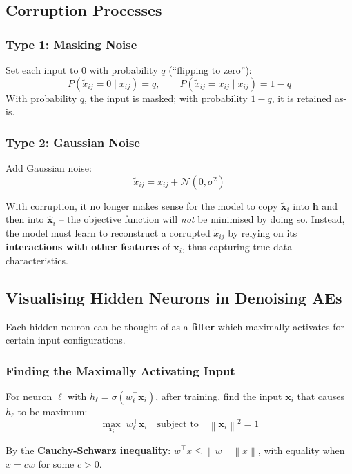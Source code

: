 \documentclass[12pt,a4paper]{article}
\newcommand{\norm}[1]{\left\|#1\right\|}
\newcommand{\vx}{\mathbf{x}}
\newcommand{\vh}{\mathbf{h}}
\newcommand{\hatx}{\hat{\mathbf{x}}}
\begin{document}
\subsection{Corruption Processes}

\subsubsection{Type 1: Masking Noise}

Set each input to 0 with probability $q$ (``flipping to zero''):
\[
P(\tilde{x}_{ij} = 0 \mid x_{ij}) = q, \qquad
P(\tilde{x}_{ij} = x_{ij} \mid x_{ij}) = 1 - q
\]
With probability $q$, the input is masked; with probability $1-q$, it is retained as-is.

\subsubsection{Type 2: Gaussian Noise}

Add Gaussian noise:
\[
\tilde{x}_{ij} = x_{ij} + \mathcal{N}(0, \sigma^2)
\]

\begin{alertbox}
With corruption, it no longer makes sense for the model to copy $\tilde{\vx}_i$ into $\vh$ and then into $\hatx_i$ -- the objective function will \emph{not} be minimised by doing so. Instead, the model must learn to reconstruct a corrupted $\tilde{x}_{ij}$ by relying on its \textbf{interactions with other features} of $\vx_i$, thus capturing true data characteristics.
\end{alertbox}

\subsection{Visualising Hidden Neurons in Denoising AEs}

Each hidden neuron can be thought of as a \textbf{filter} which maximally activates for certain input configurations.

\subsubsection{Finding the Maximally Activating Input}

For neuron $\ell$ with $h_\ell = \sigma(w_\ell^\top\vx_i)$, after training, find the input $\vx_i$ that causes $h_\ell$ to be maximum:
\[
\max_{\vx_i}\; w_\ell^\top\vx_i
\quad\text{subject to}\quad
\norm{\vx_i}^2 = 1
\]

By the \textbf{Cauchy-Schwarz inequality}: $w^\top x \leq \norm{w}\norm{x}$, with equality when $x = cw$ for some $c > 0$.
\end{document}

